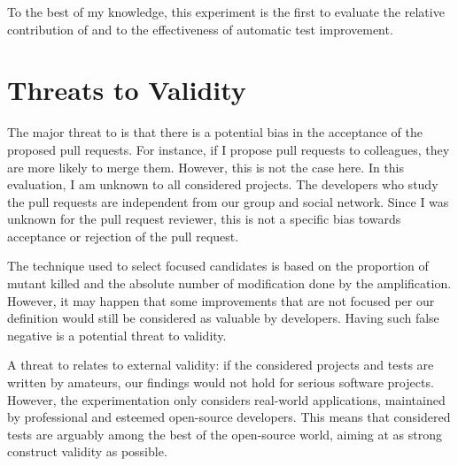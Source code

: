To the best of my knowledge, this experiment is the first to evaluate the relative contribution of \Iampl and \Aampl to the effectiveness of automatic test improvement.

\section{Threats to Validity}
\label{sec:test-improvement:threats}

\textbf{\rqpullrequest{}}
The major threat to \rqpullrequest{} is that there is a potential bias in the acceptance of the proposed pull requests.
For instance, if I propose pull requests to colleagues, they are more likely to merge them.
However, this is not the case here.
In this evaluation, I am unknown to all considered projects. 
The developers who study the \dspot pull requests are independent from our group and social network.
Since I was unknown for the pull request reviewer, this is not a specific bias towards acceptance or rejection of the pull request.

\textbf{\rqcandidates{}}
The technique used to select focused candidates is based on the proportion of mutant killed and the absolute number of modification done by the amplification. 
However, it may happen that some improvements that are not focused per our definition would still be considered as valuable by developers. 
Having such false negative is a potential threat to validity.

\textbf{\rqeffectiveness{}}
A threat to \rqeffectiveness{} relates to external validity: if the considered projects and tests are written by amateurs, our findings would not hold for serious software projects.
However, the experimentation only considers real-world applications, maintained by professional and esteemed open-source developers. 
This means that considered tests are arguably among the best of the open-source world, aiming at as strong construct validity as possible.

